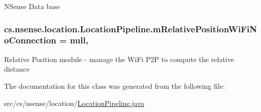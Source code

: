 N\-Sense Data base \hypertarget{classcs_1_1nsense_1_1location_1_1_location_pipeline_a65a3446ea75bf2a6991719825e7ac15c}{
\subsubsection[{m\-Relative\-Position\-Wi\-Fi\-No\-Connection}]{ cs.\-nsense.\-location.\-Location\-Pipeline.\-m\-Relative\-Position\-Wi\-Fi\-No\-Connection = null\hspace{0.3cm}{\ttfamily [static]}, {\ttfamily [private]}}}\label{classcs_1_1nsense_1_1location_1_1_location_pipeline_a65a3446ea75bf2a6991719825e7ac15c}
Relative Position module -\/ manage the Wi\-Fi P2\-P to compute the relative distance 

The documentation for this class was generated from the following file\-:\begin{DoxyCompactItemize}
\item 
src/cs/nsense/location/\hyperlink{_location_pipeline_8java}{Location\-Pipeline.\-java}\end{DoxyCompactItemize}
